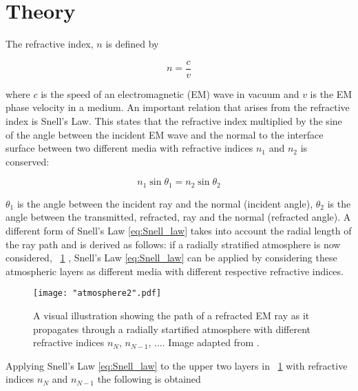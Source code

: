 \documentclass[11pt]{article}
\newcommand{\figref}[2][\figurename~]{#1\ref{#2}}
\begin{document}
\section{Theory}
\label{sec:theory}

The refractive index, $n$ is defined by

\begin{equation}
\label{eq:ref_index}
n = \frac{c}{v}
\end{equation}

\vspace{2mm}
\noindent
where $c$ is the speed of an electromagnetic (EM) wave in vacuum and $v$ is the EM phase velocity in a medium. An important relation that arises from the refractive index is Snell's Law. This states that the refractive index multiplied by the sine of the angle between the incident EM wave and the normal to the interface surface between two different media with refractive indices $n_1$ and $n_2$ is conserved:

\begin{equation}
\label{eq:Snell_law}
n_1\sin{\theta_1} = n_2\sin{\theta_2}
\end{equation}

\vspace{2mm}
\noindent
$\theta_1$ is the angle between the incident ray and the normal (incident angle), $\theta_2$ is the angle between the transmitted, refracted, ray and the normal (refracted angle). A different form of Snell's Law \eqref{eq:Snell_law} takes into account the radial length of the ray path and is derived as follows: if a radially stratified atmosphere is now considered, \figref{fig:atmosphere} \cite{Paper02}, Snell's Law \eqref{eq:Snell_law} can be applied by considering these atmospheric layers as different media with different respective refractive indices.

\begin{figure}[h]
\centering
\texttt{[image: "atmosphere2".pdf]}
\caption{A visual illustration showing the path of a refracted EM ray as it propagates through a radially startified atmosphere with different refractive indices $n_N$, $n_{N-1}$, $\dots$. Image adapted from \cite{Paper02}.}
\label{fig:atmosphere}
\end{figure}

\newpage
\vspace{2mm}
\noindent
Applying Snell's Law \eqref{eq:Snell_law} to the upper two layers in \figref{fig:atmosphere} with refractive indices $n_N$ and $n_{N-1}$ the following is obtained
\end{document}

